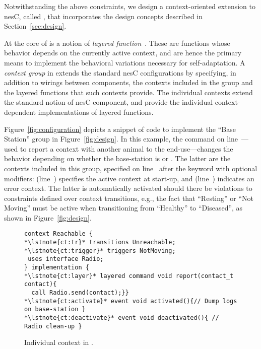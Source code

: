 \fakepar{\conesc} Notwithstanding the above constraints, we design a
context-oriented extension to nesC, called \conesc, that incorporates
the design concepts described in Section~\ref{sec:design}. 

At the core of \conesc is a notion of \emph{layered
  function}~\cite{Hirschfeld08}. These are functions whose behavior
depends on the currently active context, and are hence the primary
means to implement the behavioral variations necessary for
self-adaptation. A \emph{context group} in \conesc extends the
standard nesC configurations by specifying, in addition to wirings
between components, the contexts included in the group and the layered
functions that such contexts provide. The individual contexts extend
the standard notion of nesC component, and provide the individual
context-dependent implementations of layered functions.

Figure~\ref{fig:configuration} depicts a snippet of \conesc code to
implement the ``Base Station'' group in Figure~\ref{fig:design}. In
this example, the  command on
line~---used to report a context with another animal
to the end-use---changes the behavior depending on whether the
base-station is  or . The latter are
the contexts included in this group, specified on line~
after the keyword  with optional modifiers:  (line~) specifies the active context at
start-up, and  (line~) indicates an
error context. The latter is automatically activated should there be
violations to constraints defined over context transitions, e.g., the
fact that ``Resting'' or ``Not Moving'' must be active when
transitioning from ``Healthy'' to ``Diseased'', as shown in
Figure~\ref{fig:design}.

\begin{figure}[!tb]
\begin{lstlisting}[style=conescframe]
context Reachable {
*\lstnote{ct:tr}* transitions Unreachable;
*\lstnote{ct:trigger}* triggers NotMoving;
 uses interface Radio;
} implementation {
*\lstnote{ct:layer}* layered command void report(contact_t contact){
  call Radio.send(contact);}}
*\lstnote{ct:activate}* event void activated(){// Dump logs on base-station }
*\lstnote{ct:deactivate}* event void deactivated(){ // Radio clean-up }
\end{lstlisting}
\vspace{-4mm}
\caption{Individual context in \conesc.}
  \label{fig:context}
\vspace{-4mm}
\end{figure}

